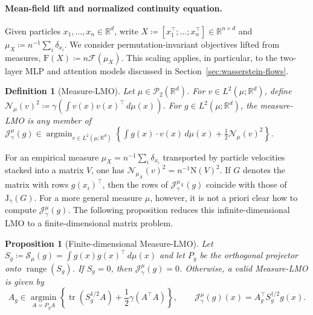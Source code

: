 \documentclass{article}
\newtheorem{proposition}[theorem]{Proposition}
\newtheorem{definition}[theorem]{Definition}
\newcommand{\R}{\mathbb{R}}
\newcommand{\cP}{\mathcal{P}}
\newcommand{\mF}{\mathrm{F}}
\newcommand{\mN}{\mathrm{N}}
\newcommand{\mJ}{\mathrm{J}}
\newcommand{\MF}{\mathcal{F}}
\newcommand{\MN}{\mathcal{N}}
\newcommand{\MJ}{\mathcal{J}}
\newcommand{\tr}{\operatorname{tr}}
\begin{document}
\paragraph{Mean-field lift and normalized continuity equation.}
Given particles $x_1,\dots,x_n\in\R^d$, write
$X\coloneqq[x_1^\top;\ldots;x_n^\top]\in\R^{n\times d}$ and
$\mu_X\coloneqq n^{-1}\sum_i\delta_{x_i}$. We consider
permutation-invariant objectives lifted from measures,
$\mF(X)\coloneqq n\MF(\mu_X)$. This scaling applies, in particular, to the
two-layer MLP and attention models discussed in
Section~\ref{sec:wasserstein-flows}.


\begin{definition}[Measure-LMO]
\label{def:duality}
Let $\mu\in\cP_2(\R^d)$. For $v\in L^2(\mu;\R^d)$, define
$\MN_\mu(v)^2\coloneqq \gamma\!\left(\int v(x)v(x)^\top\,d\mu(x)\right)$.
For $g\in L^2(\mu;\R^d)$, the measure-LMO is any member of
$\MJ_\gamma^\mu(g) \in 
\operatorname*{argmin}_{v\in L^2(\mu;\R^d)}
\left\{ \int g(x)\cdot v(x)\,d\mu(x) +\frac12\MN_\mu(v)^2 \right\}$.
\end{definition}

For an empirical measure $\mu_X=n^{-1}\sum_i\delta_{x_i}$ transported by
particle velocities stacked into a matrix $V$, one has
$\MN_{\mu_X}(v)^2=n^{-1}\mN(V)^2$. If $G$ denotes the matrix with rows
$g(x_i)^\top$, then the rows of $\MJ_\gamma^{\mu_X}(g)$ coincide with those of
$\mJ_\gamma(G)$.
%
For a more general measure $\mu$, however, it is not a priori clear how to compute
$\MJ_\gamma^{\mu}(g)$. The following proposition reduces this infinite-dimensional
LMO to a finite-dimensional matrix problem.

\begin{proposition}[Finite-dimensional Measure-LMO]
\label{prop:measure-lmo-reduction}
Let $S_g\coloneqq\mathcal S_\mu(g)=\int g(x)g(x)^\top\,d\mu(x)$ and let
$P_g$ be the orthogonal projector onto $\operatorname{range}(S_g)$.  If
$S_g=0$, then $\MJ_\gamma^\mu(g)=0$. Otherwise, a valid Measure-LMO is given by
\[
    A_g\in
    \operatorname*{argmin}_{A=P_gA}
    \left\{
        \tr(S_g^{1/2}A)+\frac12\gamma(A^\top A)
    \right\},
    \qquad
    \MJ_\gamma^\mu(g)(x)=A_g^\top S_g^{\dagger/2}g(x).
\]
\end{proposition}
\end{document}
